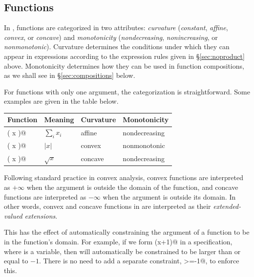 \documentclass[12pt]{article}
\begin{document}
\subsection{Functions}
\label{sec:functions}


In \cvx, functions are categorized in two attributes: \emph{curvature}
(\emph{constant}, \emph{affine},
\emph{convex}, or \emph{concave}) and
\emph{monotonicity}
(\emph{nondecreasing}, \emph{nonincreasing}, or \emph{nonmonotonic}).
Curvature determines the conditions
under which they can appear in expressions according to the
expression rules given in \S\ref{sec:noproduct} above.
Monotonicity determines
how they can be used in function  compositions, 
as we shall see in \S\ref{sec:compositions} below.

For functions with only one argument, the categorization is 
straightforward.  Some examples are given in the table below.
\begin{center}
\begin{tabular}{llll}
Function & Meaning & Curvature & Monotonicity \\ \hline
	\verb@sum( x )@ & $\sum_i x_i$ & affine & nondecreasing \\
	\verb@abs( x )@ & $|x|$ & convex & nonmonotonic \\
	\verb@sqrt( x )@ & $\sqrt x$ & concave & nondecreasing
\end{tabular}
\end{center}

Following standard practice in convex analysis, convex functions
are interpreted as $+\infty$ when the argument is outside the domain
of the function, and concave functions are interpreted as $-\infty$
when the argument is outside its domain.
In other words, convex and concave functions in \cvx are interpreted
as their \emph{extended-valued extensions}.

This has the effect of automatically constraining the argument of 
a function to be in the function's domain.
For example, if we form \verb@sqrt(x+1)@ in a \cvx specification,
where \verb@x@ is a variable, then
\verb@x@ will automatically be constrained to be larger than or
equal to $-1$.  There is no need to add a separate constraint,
\verb@x>=-1@, to enforce this.
\end{document}
